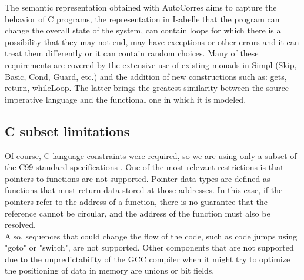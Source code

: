 \documentclass[conference]{IEEEtran}
\begin{document}
The semantic representation obtained with AutoCorres aims to capture the behavior of C programs, the representation in Isabelle that the program can change the overall state of the system, can contain loops for which there is a possibility that they may not end, may have exceptions or other errors and it can treat them differently or it can contain random choices. Many of these requirements are covered by the extensive use of existing monads in Simpl (Skip, Basic, Cond, Guard, etc.) and the addition of new constructions such as: gets, return, whileLoop. The latter brings the greatest similarity between the source imperative language and the functional one in which it is modeled.
\subsection{C subset limitations}
Of course, C-language constraints were required, so we are using only a subset of the C99 standard specifications \cite{iso}. One of the most relevant restrictions is that pointers to functions are not supported. Pointer data types are defined as functions that must return data stored at those addresses. In this case, if the pointers refer to the address of a function, there is no guarantee that the reference cannot be circular, and the address of the function must also be resolved. \\
Also, sequences that could change the flow of the code, such as code jumps using "goto" or "switch", are not supported. Other components that are not supported due to the unpredictability of the GCC compiler when it might try to optimize the positioning of data in memory are unions or bit fields.\\
\end{document}
